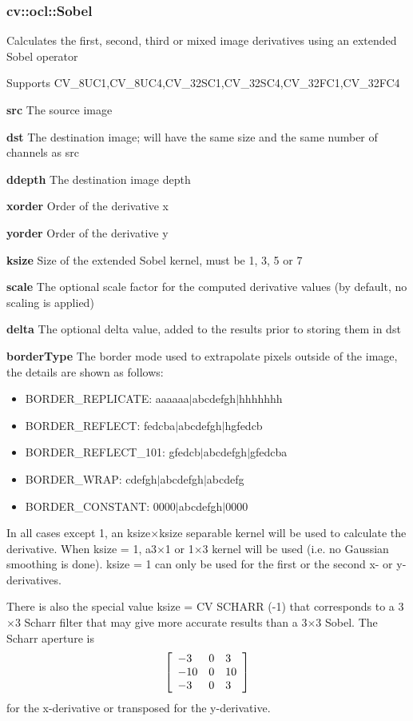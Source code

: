 \documentclass{article}
\begin{document}
\newpage

\subsubsection{cv::ocl::Sobel}
\label{subsubsec:mylabel44}
Calculates the first, second, third or mixed image derivatives using an
extended Sobel operator

Supports CV{\_}8UC1,CV{\_}8UC4,CV{\_}32SC1,CV{\_}32SC4,CV{\_}32FC1,CV{\_}32FC4

\textbf{src }The source image

\textbf{dst }The destination image; will have the same size and the same
number of channels as src

\textbf{ddepth }The destination image depth

\textbf{xorder }Order of the derivative x

\textbf{yorder }Order of the derivative y

\textbf{ksize }Size of the extended Sobel kernel, must be 1, 3, 5 or 7

\textbf{scale }The optional scale factor for the computed derivative values
(by default, no scaling is applied)

\textbf{delta }The optional delta value, added to the results prior to
storing them in dst

\textbf{borderType }The border mode used to extrapolate pixels outside of
the image, the details are shown as follows:

\begin{itemize}
\item BORDER{\_}REPLICATE: aaaaaa$\vert $abcdefgh$\vert $hhhhhhh
\item BORDER{\_}REFLECT: fedcba$\vert $abcdefgh$\vert $hgfedcb
\item BORDER{\_}REFLECT{\_}101: gfedcb$\vert $abcdefgh$\vert $gfedcba
\item BORDER{\_}WRAP: cdefgh$\vert $abcdefgh$\vert $abcdefg
\item BORDER{\_}CONSTANT: 0000$\vert $abcdefgh$\vert $0000
\end{itemize}

In all cases except 1, an ksize$\times $ksize separable kernel will be used
to calculate the derivative. When ksize = 1, a3$\times $1 or 1$\times $3
kernel will be used (i.e. no Gaussian smoothing is done). ksize = 1 can only
be used for the first or the second x- or y- derivatives.

There is also the special value ksize = CV SCHARR (-1) that corresponds to a
3$\times $3 Scharr filter that may give more accurate results than a
3$\times $3 Sobel. The Scharr aperture is
\[
\left[ {{\begin{array}{*{20}c}
 {-3} \hfill & 0 \hfill & 3 \hfill \\
 {-10} \hfill & 0 \hfill & {10} \hfill \\
 {-3} \hfill & 0 \hfill & 3 \hfill \\
\end{array} }} \right]
\]
for the x-derivative or transposed for the y-derivative.
\end{document}

